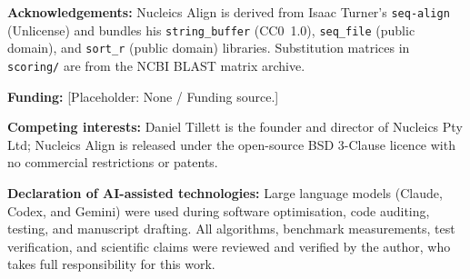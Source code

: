 \documentclass[11pt,a4paper]{article}
\begin{document}
\medskip
\noindent\textbf{Acknowledgements:} Nucleics Align is derived from Isaac Turner's \texttt{seq-align} (Unlicense) and bundles his \texttt{string\_buffer} (CC0~1.0), \texttt{seq\_file} (public domain), and \texttt{sort\_r} (public domain) libraries. Substitution matrices in \texttt{scoring/} are from the NCBI BLAST matrix archive.

\medskip
\noindent\textbf{Funding:} [Placeholder: None / Funding source.]

\medskip
\noindent\textbf{Competing interests:} Daniel Tillett is the founder and director of Nucleics Pty Ltd; Nucleics Align is released under the open-source BSD 3-Clause licence with no commercial restrictions or patents.

\medskip
\noindent\textbf{Declaration of AI-assisted technologies:} Large language models (Claude, Codex, and Gemini) were used during software optimisation, code auditing, testing, and manuscript drafting. All algorithms, benchmark measurements, test verification, and scientific claims were reviewed and verified by the author, who takes full responsibility for this work.



\end{document}
